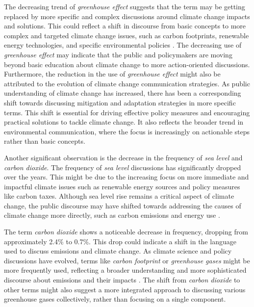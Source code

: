 The decreasing trend of \emph{greenhouse effect} suggests that the term may be getting replaced by more specific and complex discussions around climate change impacts and solutions. This could reflect a shift in discourse from basic concepts to more complex and targeted climate change issues, such as carbon footprints, renewable energy technologies, and specific environmental policies \cite{ipcc2014impacts}. The decreasing use of \emph{greenhouse effect} may indicate that the public and policymakers are moving beyond basic education about climate change to more action-oriented discussions.
Furthermore, the reduction in the use of \emph{greenhouse effect} might also be attributed to the evolution of climate change communication strategies. As public understanding of climate change has increased, there has been a corresponding shift towards discussing mitigation and adaptation strategies in more specific terms. This shift is essential for driving effective policy measures and encouraging practical solutions to tackle climate change. It also reflects the broader trend in environmental communication, where the focus is increasingly on actionable steps rather than basic concepts.

Another significant observation is the decrease in the frequency of \emph{sea level} and \emph{carbon dioxide}. The frequency of \emph{sea level} discussions has significantly dropped over the years. This might be due to the increasing focus on more immediate and impactful climate issues such as renewable energy sources and policy measures like carbon taxes. Although sea level rise remains a critical aspect of climate change, the public discourse may have shifted towards addressing the causes of climate change more directly, such as carbon emissions and energy use \cite{nasa2020,nasa2020co2}.

The term \emph{carbon dioxide} shows a noticeable decrease in frequency, dropping from approximately 2.4\% to 0.7\%. This drop could indicate a shift in the language used to discuss emissions and climate change. As climate science and policy discussions have evolved, terms like \emph{carbon footprint} or \emph{greenhouse gases} might be more frequently used, reflecting a broader understanding and more sophisticated discourse about emissions and their impacts \cite{unep2019}. The shift from \emph{carbon dioxide} to other terms might also suggest a more integrated approach to discussing various greenhouse gases collectively, rather than focusing on a single component.

